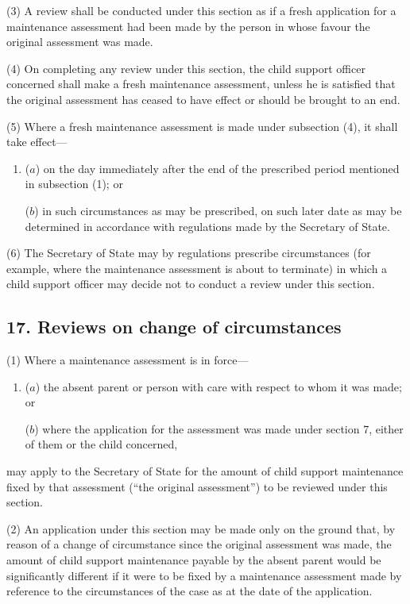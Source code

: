 \documentclass[12pt,a4paper]{article}
\begin{document}
(3) A review shall be conducted under this section as if a fresh application for a maintenance assessment had been made by the person in whose favour the original assessment was made.

(4) On completing any review under this section, the child support officer concerned shall make a fresh maintenance assessment, unless he is satisfied that the original assessment has ceased to have effect or should be brought to an end.

(5) Where a fresh maintenance assessment is made under subsection (4), it shall take effect—
\begin{enumerate}\item[]
($a$) on the day immediately after the end of the prescribed period mentioned in subsection (1); or

($b$) in such circumstances as may be prescribed, on such later date as may be determined in accordance with regulations made by the Secretary of State.
\end{enumerate}

(6) The Secretary of State may by regulations prescribe circumstances (for example, where the maintenance assessment is about to terminate) in which a child support officer may decide not to conduct a review under this section.


\subsection{17. Reviews on change of circumstances}

(1) Where a maintenance assessment is in force—
\begin{enumerate}\item[]
($a$) the absent parent or person with care with respect to whom it was made; or

($b$) where the application for the assessment was made under section 7, either of them or the child concerned,
\end{enumerate}
may apply to the Secretary of State for the amount of child support maintenance fixed by that assessment (“the original assessment”) to be reviewed under this section.

(2) An application under this section may be made only on the ground that, by reason of a change of circumstance since the original assessment was made, the amount of child support maintenance payable by the absent parent would be significantly different if it were to be fixed by a maintenance assessment made by reference to the circumstances of the case as at the date of the application.
\end{document}
